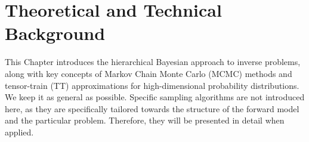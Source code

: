 \chapter{Theoretical and Technical Background}
\label{ch:background}
\thispagestyle{empty}
This Chapter introduces the hierarchical Bayesian approach to inverse problems, along with key concepts of Markov Chain Monte Carlo (MCMC) methods and tensor-train (TT) approximations for high-dimensional probability distributions.
We keep it as general as possible.
Specific sampling algorithms are not introduced here, as they are specifically tailored towards the structure of the forward model and the particular problem. Therefore, they will be presented in detail when applied.


